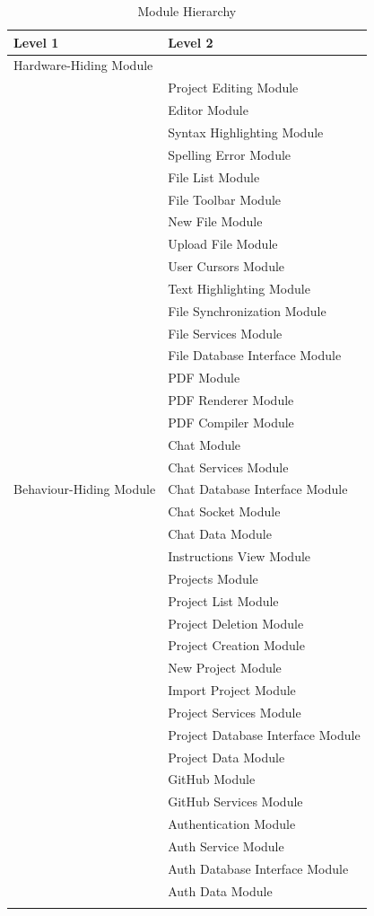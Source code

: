 \documentclass[12pt, titlepage]{article}
\begin{document}
	
	\begin{table}[H]
		\centering
		\scriptsize\begin{longtable}{p{} p{}}
			\caption{Module Hierarchy} \\
			\toprule
			\textbf{Level 1} & \textbf{Level 2}\\
			\midrule
			
			{Hardware-Hiding Module} & ~ \\
			\midrule
			
			\multirow{37}{0.3\textwidth}{Behaviour-Hiding Module}  & Project Editing Module \\
			& Editor Module \\
			& Syntax Highlighting Module \\
			& Spelling Error Module \\
			& File List Module \\
			& File Toolbar Module \\
			& New File Module \\
			& Upload File Module \\
			& User Cursors Module \\
			& Text Highlighting Module \\
			& File Synchronization Module \\
			& File Services Module \\
			& File Database Interface Module \\
			& PDF Module \\
			& PDF Renderer Module \\
			& PDF Compiler Module \\
			& Chat Module \\
			& Chat Services Module \\
			& Chat Database Interface Module \\
			& Chat Socket Module \\
			& Chat Data Module \\
			& Instructions View Module \\
			& Projects Module \\
			& Project List Module \\
			& Project Deletion Module \\
			& Project Creation Module \\
			& New Project Module \\
			& Import Project Module \\
			& Project Services Module \\
			& Project Database Interface Module \\
			& Project Data Module \\
			& GitHub Module \\
			& GitHub Services Module \\
			& Authentication Module \\
			& Auth Service Module \\
			& Auth Database Interface Module \\
			& Auth Data Module \\
			\midrule
			\newpage
			\multirow{1}{0.3\textwidth}{Software Decision Module} & \\
			\bottomrule
			

\end{longtable}
\end{table}
\end{document}
